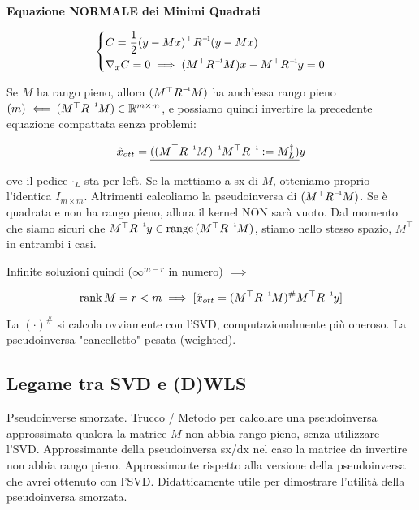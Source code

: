 \begin{defn}{\textbf{Equazione NORMALE dei Minimi Quadrati}}

\[
	\left\{
	\begin{aligned}
	&C = \frac{1}{2}(y-Mx)^\top\inv{R}(y-Mx)\\
	&\nabla_x{C} = 0 \implies (M^\top\inv{R}M)x-M^\top\inv{R}y=0
	\end{aligned}
	\right.
\]

\end{defn}

Se $M$ ha rango pieno, allora $(M^\top\inv{R}M)$ ha anch'essa rango pieno $(m) \impliedby (M^\top\inv{R}M)\in\R^{m\times m}$, e possiamo quindi invertire la precedente equazione compattata senza problemi:

\[
	\hat{x}_{ott} = \underline{(\inv{(M^\top\inv{R}M)}M^\top\inv{R} := M^\dag_L)}y
\]

ove il pedice $\mathord{\cdot}_L$ sta per left. Se la mettiamo a sx di $M$, otteniamo proprio l'identica $I_{m\times m}$. Altrimenti calcoliamo la pseudoinversa di $(M^\top\inv{R}M)$. Se è quadrata e non ha rango pieno, allora il kernel NON sarà vuoto. Dal momento che siamo sicuri che $M^\top\inv{R}y\in\range{(M^\top\inv{R}M)}$, stiamo nello stesso spazio, $M^\top$ in entrambi i casi.

Infinite soluzioni quindi ($\infty^{m-r}$ in numero) $\implies$

\[
	\rank{M} = r<m \implies [\hat{x}_{ott} = (M^\top\inv{R}M)^\# M^\top\inv{R}y]
\]

La $(\mathord{\cdot})^\#$ si calcola ovviamente con l'SVD, computazionalmente più oneroso. La pseudoinversa "cancelletto" pesata (weighted).
	
\subsection{Legame tra SVD e (D)WLS}

Pseudoinverse smorzate. Trucco / Metodo per calcolare una pseudoinversa approssimata qualora la matrice $M$ non abbia rango pieno, senza utilizzare l'SVD. Approssimante della pseudoinversa sx/dx nel caso la matrice da invertire non abbia rango pieno. Approssimante rispetto alla versione della pseudoinversa che avrei ottenuto con l'SVD. Didatticamente utile per dimostrare l'utilità della pseudoinversa smorzata.

